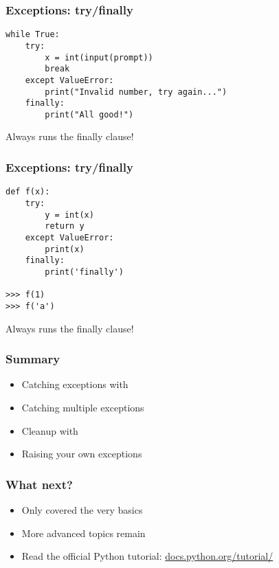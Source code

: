 \documentclass[14pt,compress]{beamer}
\begin{document}
\begin{frame}[fragile]
  \frametitle{Exceptions: try/finally}
  \small
\begin{lstlisting}
while True:
    try:
        x = int(input(prompt))
        break
    except ValueError:
        print("Invalid number, try again...")
    finally:
        print("All good!")

      \end{lstlisting}
      \normalsize
      Always runs the finally clause!
\end{frame}


\begin{frame}[fragile]
  \frametitle{Exceptions: try/finally}
  \begin{lstlisting}
def f(x):
    try:
        y = int(x)
        return y
    except ValueError:
        print(x)
    finally:
        print('finally')

>>> f(1)
>>> f('a')
\end{lstlisting}
Always runs the finally clause!
\end{frame}


\begin{frame}
  \frametitle{Summary}
  \begin{itemize}
  \item Catching exceptions with 
  \item Catching multiple exceptions
  \item Cleanup with 
  \item Raising your own exceptions
  \end{itemize}
\end{frame}

\begin{frame}
  \frametitle{What next?}
  \begin{itemize}
  \item Only covered the very basics
  \item More advanced topics remain
  \item Read the official Python tutorial:
    \url{docs.python.org/tutorial/}
  \end{itemize}
\end{frame}
\end{document}
